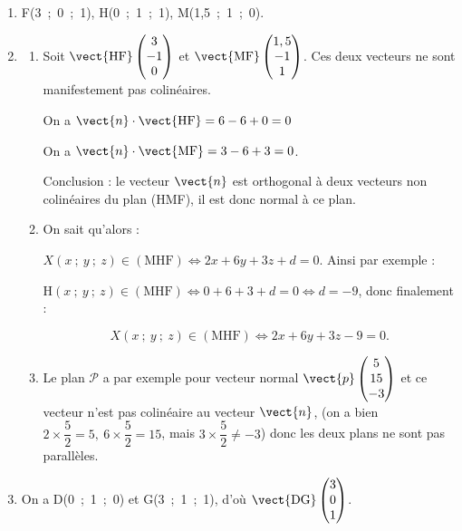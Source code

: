\begin{enumerate}
\item %
F(3~;~0~;~1), \: H(0~;~1~;~1), \:M(1,5~;~1~;~0).
\item 
	\begin{enumerate}
		\item %
	
Soit $\vect{\text{HF}}\begin{pmatrix}3\\-1\\0\end{pmatrix}$ et $\vect{\text{MF}}\begin{pmatrix}1,5\\-1\\1\end{pmatrix}$. Ces deux vecteurs ne sont manifestement pas colinéaires.

On a $\vect{n} \cdot \vect{\text{HF}} = 6 - 6 + 0 = 0$

On a $\vect{n} \cdot \vect{\text{MF}} = 3 - 6 + 3 = 0$.

Conclusion : le vecteur $\vect{n}$ est orthogonal à deux vecteurs non colinéaires du plan  (HMF), il est donc normal à ce plan.
		\item %
On sait qu'alors :

$X(x~;~y~;~z) \in  (\text{MHF}) \iff 2x + 6y + 3z + d = 0$. Ainsi par exemple :

$\text{H}(x~;~y~;~z) \in  (\text{MHF}) \iff 0 + 6 + 3 + d = 0 \iff d = - 9$, donc finalement :

\[X(x~;~y~;~z) \in  (\text{MHF}) \iff 2x + 6y + 3z - 9 = 0.\]
		\item %
Le plan $\mathcal{P}$ a par exemple pour vecteur normal $\vect{p}\begin{pmatrix}5\\15\\-3\end{pmatrix}$ et ce vecteur n'est pas colinéaire au vecteur $\vect{n}$, (on a bien $2 \times \dfrac52 = 5, \: 6 \times \dfrac52 = 15$, mais $3 \times \dfrac52 \ne - 3$)  donc les deux plans ne sont pas parallèles.
	\end{enumerate}
\item %
On a D(0~;~1~;~0) et G(3~;~1~;~1), d'où $\vect{\text{DG}}\begin{pmatrix}3\\0\\1\end{pmatrix}$.


\end{enumerate}
